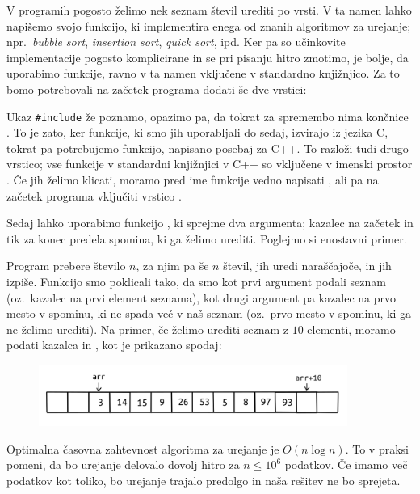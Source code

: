 V programih pogosto želimo nek seznam števil urediti po vrsti.
V ta namen lahko napišemo svojo funkcijo, ki implementira enega od znanih
algoritmov za urejanje; npr.~\emph{bubble sort}, \emph{insertion sort},
\emph{quick sort}, ipd.
Ker pa so učinkovite implementacije pogosto komplicirane in se pri pisanju hitro
zmotimo, je bolje, da uporabimo funkcije, ravno v ta namen vključene v
standardno knjižnjico.
Za to bomo potrebovali na začetek programa dodati še dve vrstici:


Ukaz \verb+#include+ že poznamo, opazimo pa, da tokrat za spremembo nima končnice
.
To je zato, ker funkcije, ki smo jih uporabljali do sedaj, izvirajo iz jezika C,
tokrat pa potrebujemo funkcijo, napisano posebaj za C++.
To razloži tudi drugo vrstico; vse funkcije v standardni knjižnjici v C++ so
vključene v imenski prostor .
Če jih želimo klicati, moramo pred ime funkcije vedno napisati , ali
pa na začetek programa vključiti vrstico .

Sedaj lahko uporabimo funkcijo , ki sprejme dva argumenta;
kazalec na začetek in tik za konec predela spomina, ki ga želimo urediti.
Poglejmo si enostavni primer.


Program prebere število $n$, za njim pa še $n$ števil, jih uredi naraščajoče,
in jih izpiše.
Funkcijo  smo poklicali tako, da smo kot prvi argument podali seznam
 (oz.~kazalec na prvi element seznama), kot drugi argument pa kazalec
na prvo mesto v spominu, ki ne spada več v naš seznam (oz.~prvo mesto v spominu,
ki ga ne želimo urediti).
Na primer, če želimo urediti seznam  z $10$ elementi, moramo podati
kazalca  in , kot je prikazano spodaj:

\begin{figure}[h!]
  \centering
  \includegraphics[width=0.9\textwidth]{poglavja/urejanje/addressing}
\end{figure}

Optimalna časovna zahtevnost algoritma za urejanje je $O(n \log n)$.
To v praksi pomeni, da bo urejanje delovalo dovolj hitro za $n \le 10^6$
podatkov.
Če imamo več podatkov kot toliko, bo urejanje trajalo predolgo in naša rešitev
ne bo sprejeta.

